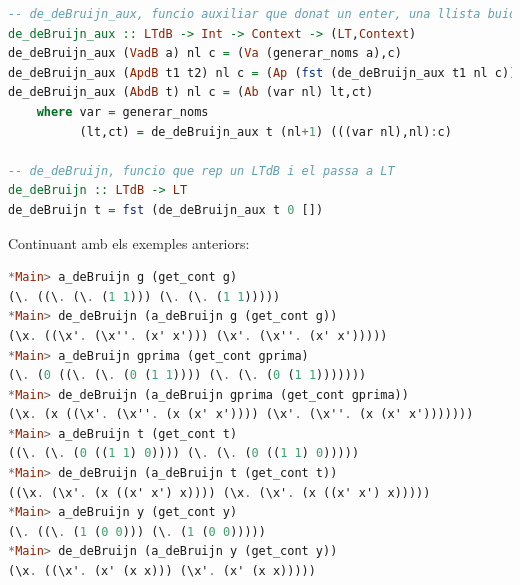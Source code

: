 \documentclass[10pt,a4paper]{article}
\begin{document}
\begin{lstlisting}[language=Haskell]
-- de_deBruijn_aux, funcio auxiliar que donat un enter, una llista buida i un LTdB, retorna una tupla amb el LTdB convertit a LT i el seu context, el enter es per controlar/generar els noms de les variables
de_deBruijn_aux :: LTdB -> Int -> Context -> (LT,Context)
de_deBruijn_aux (VadB a) nl c = (Va (generar_noms a),c)
de_deBruijn_aux (ApdB t1 t2) nl c = (Ap (fst (de_deBruijn_aux t1 nl c)) (fst (de_deBruijn_aux t2 nl c)),c)
de_deBruijn_aux (AbdB t) nl c = (Ab (var nl) lt,ct)
    where var = generar_noms
          (lt,ct) = de_deBruijn_aux t (nl+1) (((var nl),nl):c)

-- de_deBruijn, funcio que rep un LTdB i el passa a LT
de_deBruijn :: LTdB -> LT
de_deBruijn t = fst (de_deBruijn_aux t 0 [])
\end{lstlisting}

Continuant amb els exemples anteriors:

\begin{lstlisting}[language=Haskell]
*Main> a_deBruijn g (get_cont g)
(\. ((\. (\. (1 1))) (\. (\. (1 1)))))
*Main> de_deBruijn (a_deBruijn g (get_cont g))
(\x. ((\x'. (\x''. (x' x'))) (\x'. (\x''. (x' x')))))
*Main> a_deBruijn gprima (get_cont gprima)
(\. (0 ((\. (\. (0 (1 1)))) (\. (\. (0 (1 1)))))))
*Main> de_deBruijn (a_deBruijn gprima (get_cont gprima))
(\x. (x ((\x'. (\x''. (x (x' x')))) (\x'. (\x''. (x (x' x')))))))
*Main> a_deBruijn t (get_cont t)
((\. (\. (0 ((1 1) 0)))) (\. (\. (0 ((1 1) 0)))))
*Main> de_deBruijn (a_deBruijn t (get_cont t))
((\x. (\x'. (x ((x' x') x)))) (\x. (\x'. (x ((x' x') x)))))
*Main> a_deBruijn y (get_cont y)
(\. ((\. (1 (0 0))) (\. (1 (0 0)))))
*Main> de_deBruijn (a_deBruijn y (get_cont y))
(\x. ((\x'. (x' (x x))) (\x'. (x' (x x)))))
\end{lstlisting}
\end{document}
